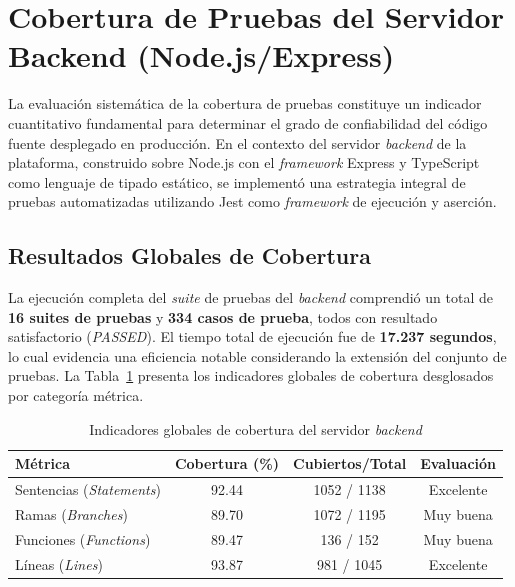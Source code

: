 
\section{Cobertura de Pruebas del Servidor Backend (Node.js/Express)}
\label{sec:cobertura-backend}

La evaluaci\'on sistem\'atica de la cobertura de pruebas constituye un indicador
cuantitativo fundamental para determinar el grado de confiabilidad del c\'odigo
fuente desplegado en producci\'on. En el contexto del servidor \textit{backend}
de la plataforma, construido sobre Node.js con el \textit{framework} Express y
TypeScript como lenguaje de tipado est\'atico, se implement\'o una estrategia
integral de pruebas automatizadas utilizando Jest como \textit{framework} de
ejecuci\'on y aserci\'on.

\subsection{Resultados Globales de Cobertura}
\label{subsec:resultados-cobertura-backend}

La ejecuci\'on completa del \textit{suite} de pruebas del \textit{backend}
comprendi\'o un total de \textbf{16 suites de pruebas} y \textbf{334 casos de
prueba}, todos con resultado satisfactorio (\textit{PASSED}). El tiempo total
de ejecuci\'on fue de \textbf{17.237 segundos}, lo cual evidencia una eficiencia
notable considerando la extensi\'on del conjunto de pruebas. La
Tabla~\ref{tab:cobertura-backend} presenta los indicadores globales de cobertura
desglosados por categor\'ia m\'etrica.

\begin{table}[htbp]
\centering
\caption{Indicadores globales de cobertura del servidor \textit{backend}}
\label{tab:cobertura-backend}
\begin{tabular}{|l|c|c|c|}
\hline
\textbf{M\'etrica} & \textbf{Cobertura (\%)} & \textbf{Cubiertos/Total} & \textbf{Evaluaci\'on} \\
\hline
Sentencias (\textit{Statements}) & 92.44 & 1052 / 1138 & Excelente \\
\hline
Ramas (\textit{Branches})        & 89.70 & 1072 / 1195 & Muy buena \\
\hline
Funciones (\textit{Functions})    & 89.47 & 136 / 152   & Muy buena \\
\hline
L\'ineas (\textit{Lines})        & 93.87 & 981 / 1045  & Excelente \\
\hline
\end{tabular}
\end{table}


